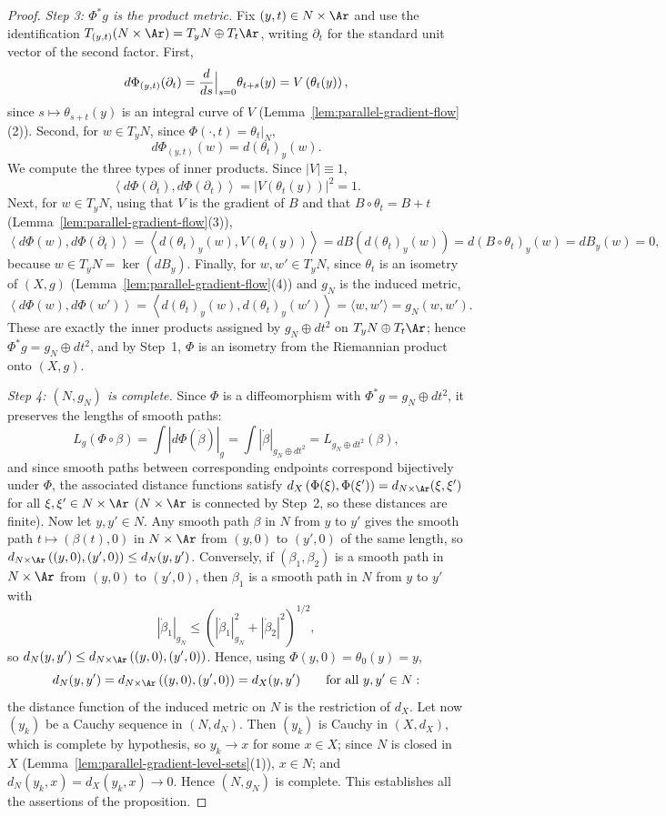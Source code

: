 \begin{proof}
\emph{Step 3: $\Phi^*g$ is the product metric.} Fix $(y,t)\in
N\times\Ar$ and use the identification
$T_{(y,t)}(N\times\Ar)=T_yN\oplus T_t\Ar$, writing $\partial_t$ for the
standard unit vector of the second factor. First,
$$d\Phi_{(y,t)}(\partial_t)
=\frac{d}{ds}\Bigl|_{s=0}\Bigr.\theta_{t+s}(y)
=V\left(\theta_t(y)\right),$$
since $s\mapsto\theta_{s+t}(y)$ is an integral curve of $V$
(Lemma~\ref{lem:parallel-gradient-flow}(2)). Second, for $w\in T_yN$,
since $\Phi(\cdot,t)=\theta_t|_N$,
$$d\Phi_{(y,t)}(w)=d(\theta_t)_y(w).$$
We compute the three types of inner products. Since $|V|\equiv1$,
$$\left\langle d\Phi(\partial_t),d\Phi(\partial_t)\right\rangle
=\left|V(\theta_t(y))\right|^2=1 .$$
Next, for $w\in T_yN$, using that $V$ is the gradient of $B$ and that
$B\circ\theta_t=B+t$ (Lemma~\ref{lem:parallel-gradient-flow}(3)),
$$\left\langle d\Phi(w),d\Phi(\partial_t)\right\rangle
=\left\langle d(\theta_t)_y(w),V(\theta_t(y))\right\rangle
=dB\left(d(\theta_t)_y(w)\right)
=d(B\circ\theta_t)_y(w)
=dB_y(w)=0,$$
because $w\in T_yN=\ker(dB_y)$. Finally, for $w,w'\in T_yN$, since
$\theta_t$ is an isometry of $(X,g)$
(Lemma~\ref{lem:parallel-gradient-flow}(4)) and $g_N$ is the induced
metric,
$$\left\langle d\Phi(w),d\Phi(w')\right\rangle
=\left\langle d(\theta_t)_y(w),d(\theta_t)_y(w')\right\rangle
=\langle w,w'\rangle=g_N(w,w') .$$
These are exactly the inner products assigned by $g_N\oplus dt^2$ on
$T_yN\oplus T_t\Ar$; hence $\Phi^*g=g_N\oplus dt^2$, and by Step~1,
$\Phi$ is an isometry from the Riemannian product onto $(X,g)$.

\emph{Step 4: $(N,g_N)$ is complete.} Since $\Phi$ is a diffeomorphism
with $\Phi^*g=g_N\oplus dt^2$, it preserves the lengths of smooth
paths:
$$L_g(\Phi\circ\beta)
=\int\left|d\Phi(\dot\beta)\right|_g
=\int|\dot\beta|_{g_N\oplus dt^2}
=L_{g_N\oplus dt^2}(\beta),$$
and since smooth paths between corresponding endpoints correspond
bijectively under $\Phi$, the associated distance functions satisfy
$d_X\left(\Phi(\xi),\Phi(\xi')\right)=d_{N\times\Ar}(\xi,\xi')$ for all
$\xi,\xi'\in N\times\Ar$ ($N\times\Ar$ is connected by Step~2, so these
distances are finite). Now let $y,y'\in N$. Any smooth path $\beta$ in
$N$ from $y$ to $y'$ gives the smooth path $t\mapsto(\beta(t),0)$ in
$N\times\Ar$ from $(y,0)$ to $(y',0)$ of the same length, so
$d_{N\times\Ar}\left((y,0),(y',0)\right)\le d_N(y,y')$. Conversely, if
$(\beta_1,\beta_2)$ is a smooth path in $N\times\Ar$ from $(y,0)$ to
$(y',0)$, then $\beta_1$ is a smooth path in $N$ from $y$ to $y'$ with
$$|\dot\beta_1|_{g_N}
\le\left(|\dot\beta_1|_{g_N}^2+|\dot\beta_2|^2\right)^{1/2},$$
so $d_N(y,y')\le d_{N\times\Ar}\left((y,0),(y',0)\right)$. Hence, using
$\Phi(y,0)=\theta_0(y)=y$,
$$d_N(y,y')=d_{N\times\Ar}\left((y,0),(y',0)\right)=d_X(y,y')
\qquad\text{for all }y,y'\in N:$$
the distance function of the induced metric on $N$ is the restriction
of $d_X$. Let now $(y_k)$ be a Cauchy sequence in $(N,d_N)$. Then
$(y_k)$ is Cauchy in $(X,d_X)$, which is complete by hypothesis, so
$y_k\to x$ for some $x\in X$; since $N$ is closed in $X$
(Lemma~\ref{lem:parallel-gradient-level-sets}(1)), $x\in N$; and
$d_N(y_k,x)=d_X(y_k,x)\to0$. Hence $(N,g_N)$ is complete. This
establishes all the assertions of the proposition.
\end{proof}


